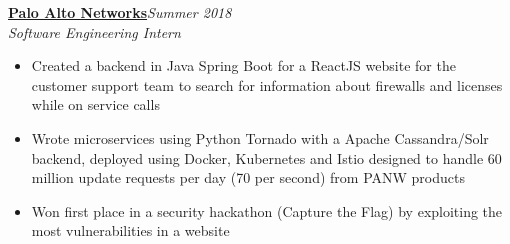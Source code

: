 \documentclass[letterpaper,8pt]{article}
\newcommand{\resitem}[1]{\item #1 \vspace{-1pt}}
\begin{document}
{\begin{itemize}[noitemsep]
\small{\item
    \textbf{\href{https://www.paloaltonetworks.com/}{\small{Palo Alto Networks}}}\hfill{\textit{Summer 2018}} \\
    \textit{\small{Software Engineering Intern}}
	\begin{itemize}[noitemsep,nolistsep]
		\resitem{\small{Created a backend in Java Spring Boot for a ReactJS website for the customer support team to search for information about firewalls and licenses while on service calls}}
		\resitem{\small{Wrote microservices using Python Tornado with a Apache Cassandra/Solr backend, deployed using Docker,  Kubernetes and Istio designed to handle 60 million update requests per day (70 per second) from PANW products}}
		\resitem{\small{Won first place in a security hackathon (Capture the Flag) by exploiting the most vulnerabilities in a website}}
	\end{itemize}




}
\end{itemize}}
\end{document}
